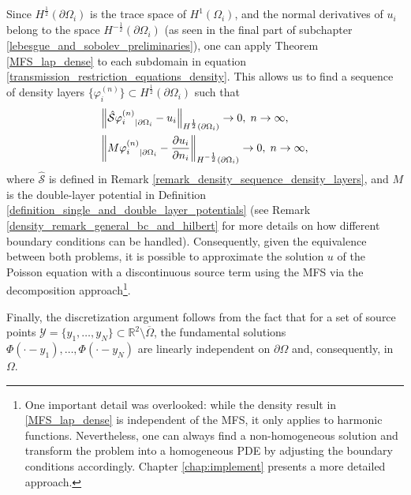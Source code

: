 Since \(H^\frac{1}{2}(\partial \Omega_i)\) is the trace space of \(H^1(\Omega_i)\), and the normal derivatives of \(u_i\) belong to the space \(H^{-\frac{1}{2}}(\partial\Omega_i)\) (as seen in the final part of subchapter \ref{lebesgue_and_sobolev_preliminaries}), one can apply Theorem \ref{MFS_lap_dense} to each subdomain in equation \eqref{transmission_restriction_equations_density}. This allows us to find a sequence of density layers \(\{\varphi^{(n)}_i\} \subset H^{\frac{1}{2}}(\partial\Omega_i)\) such that
\begin{align*}
    &\norm{{\hat{\mathcal{S}}\varphi^{(n)}_i}_{|\partial\Omega_i} - u_i}_{H^\frac{1}{2}(\partial\Omega_i)} \rightarrow 0, \; n \rightarrow \infty,\\
    &\norm{{M\varphi^{(n)}_i}_{|\partial\Omega_i} - \frac{\partial u_i}{\partial n_i}}_{H^{-\frac{1}{2}}(\partial\Omega_i)} \rightarrow 0, \; n \rightarrow \infty,
\end{align*}
where \(\hat{\mathcal{S}}\) is defined in Remark \ref{remark_density_sequence_density_layers}, and \(M\) is the double-layer potential in Definition \ref{definition_single_and_double_layer_potentials} (see Remark \ref{density_remark_general_bc_and_hilbert} for more details on how different boundary conditions can be handled). Consequently, given the equivalence between both problems, it is possible to approximate the solution \(u\) of the Poisson equation with a discontinuous source term using the \ac{MFS} via the decomposition approach\footnote{One important detail was overlooked: while the density result in \ref{MFS_lap_dense} is independent of the \ac{MFS}, it only applies to harmonic functions. Nevertheless, one can always find a non-homogeneous solution and transform the problem into a homogeneous \ac{PDE} by adjusting the boundary conditions accordingly. Chapter \ref{chap:implement} presents a more detailed approach.}.

Finally, the discretization argument follows from the fact that for a set of source points \(\mathcal{Y} = \{y_1,\dots, y_N\} \subset \mathbb{R}^2\setminus\overline{\Omega}\), the fundamental solutions \(\Phi(\cdot-y_1),\dots,\Phi(\cdot-y_N)\) are linearly independent on \(\partial \Omega\) and, consequently, in \(\Omega\).

